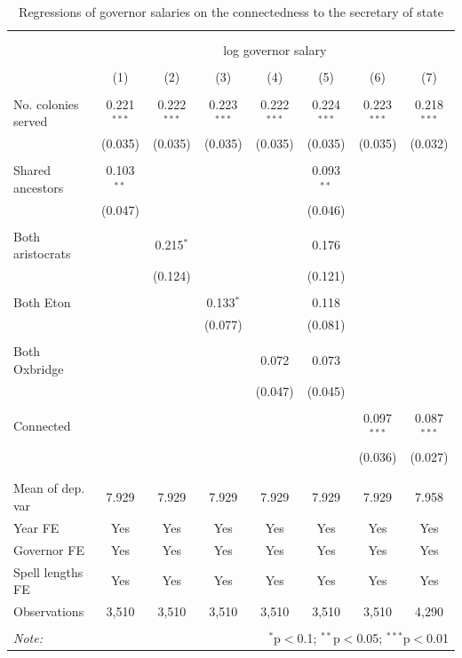 \documentclass[a4paper]{article}\usepackage[]{graphicx}\usepackage[]{color}
\begin{document}
\begin{table}[!htbp] \centering 
  \caption{Regressions of governor salaries on the connectedness to the secretary of state} 
  \label{tab:sal} 
\scriptsize 
\begin{tabular}{@{\extracolsep{5pt}}lccccccc} 
\\[-1.8ex]\hline 
\hline \\[-1.8ex] 
\\[-1.8ex] & \multicolumn{7}{c}{log governor salary} \\ 
\\[-1.8ex] & (1) & (2) & (3) & (4) & (5) & (6) & (7)\\ 
\hline \\[-1.8ex] 
 No. colonies served & 0.221$^{***}$ & 0.222$^{***}$ & 0.223$^{***}$ & 0.222$^{***}$ & 0.224$^{***}$ & 0.223$^{***}$ & 0.218$^{***}$ \\ 
  & (0.035) & (0.035) & (0.035) & (0.035) & (0.035) & (0.035) & (0.032) \\ 
  & & & & & & & \\ 
 Shared ancestors & 0.103$^{**}$ &  &  &  & 0.093$^{**}$ &  &  \\ 
  & (0.047) &  &  &  & (0.046) &  &  \\ 
  & & & & & & & \\ 
 Both aristocrats &  & 0.215$^{*}$ &  &  & 0.176 &  &  \\ 
  &  & (0.124) &  &  & (0.121) &  &  \\ 
  & & & & & & & \\ 
 Both Eton &  &  & 0.133$^{*}$ &  & 0.118 &  &  \\ 
  &  &  & (0.077) &  & (0.081) &  &  \\ 
  & & & & & & & \\ 
 Both Oxbridge &  &  &  & 0.072 & 0.073 &  &  \\ 
  &  &  &  & (0.047) & (0.045) &  &  \\ 
  & & & & & & & \\ 
 Connected &  &  &  &  &  & 0.097$^{***}$ & 0.087$^{***}$ \\ 
  &  &  &  &  &  & (0.036) & (0.027) \\ 
  & & & & & & & \\ 
\hline \\[-1.8ex] 
Mean of dep. var & 7.929 & 7.929 & 7.929 & 7.929 & 7.929 & 7.929 & 7.958 \\ 
Year FE & Yes & Yes & Yes & Yes & Yes & Yes & Yes \\ 
Governor FE & Yes & Yes & Yes & Yes & Yes & Yes & Yes \\ 
Spell lengths FE & Yes & Yes & Yes & Yes & Yes & Yes & Yes \\ 
Observations & 3,510 & 3,510 & 3,510 & 3,510 & 3,510 & 3,510 & 4,290 \\ 
\hline 
\hline \\[-1.8ex] 
\textit{Note:}  & \multicolumn{7}{r}{$^{*}$p$<$0.1; $^{**}$p$<$0.05; $^{***}$p$<$0.01} \\ 
\end{tabular} 
\end{table} 
\end{document}
